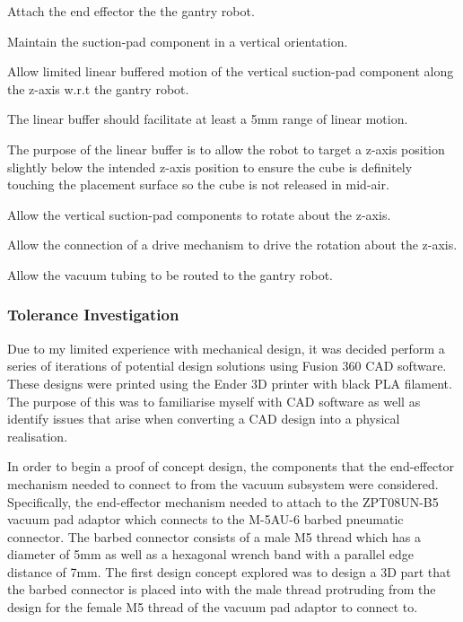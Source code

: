 \begin{compactitem}
    \item Attach the end effector the the gantry robot.
    \item Maintain the suction-pad component in a vertical orientation.
    \item Allow limited linear buffered motion of the vertical suction-pad component along the z-axis w.r.t the gantry robot.
    \item The linear buffer should facilitate at least a 5mm range of linear motion.
    \item The purpose of the linear buffer is to allow the robot to target a z-axis position slightly below the intended z-axis position to ensure the cube is definitely touching the placement surface so the cube is not released in mid-air.
    \item Allow the vertical suction-pad components to rotate about the z-axis.
    \item Allow the connection of a drive mechanism to drive the rotation about the z-axis.
    \item Allow the vacuum tubing to be routed to the gantry robot.
\end{compactitem}

\subsubsection{Tolerance Investigation}

Due to my limited experience with mechanical design, it was decided perform a series of iterations of potential design solutions using Fusion 360 \ac{CAD} software. These designs were printed using the Ender 3D printer with black PLA filament. The purpose of this was to familiarise myself with \ac{CAD} software as well as identify issues that arise when converting a \ac{CAD} design into a physical realisation.

In order to begin a proof of concept design, the components that the end-effector mechanism needed to connect to from the vacuum subsystem were considered. Specifically, the end-effector mechanism needed to attach to the ZPT08UN-B5 vacuum pad adaptor which connects to the M-5AU-6 barbed pneumatic connector. The barbed connector consists of a male M5 thread which has a diameter of 5mm as well as a hexagonal wrench band with a parallel edge distance of 7mm. The first design concept explored was to design a 3D part that the barbed connector is placed into with the male thread protruding from the design for the female M5 thread of the vacuum pad adaptor to connect to. 

